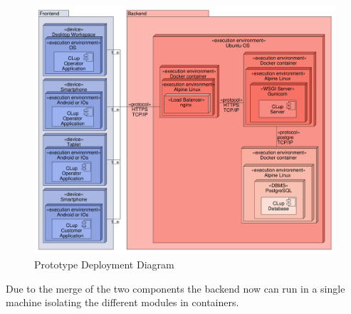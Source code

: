 \begin{figure}[H]
    \centering
    \includegraphics[width=\textwidth]{Images/UML_deployment_diagram.pdf}
    \caption{\label{fig:General Component}Prototype Deployment Diagram}
\end{figure}

Due to the merge of the two components the backend now can run in a single machine isolating the different modules in containers.

\clearpage

